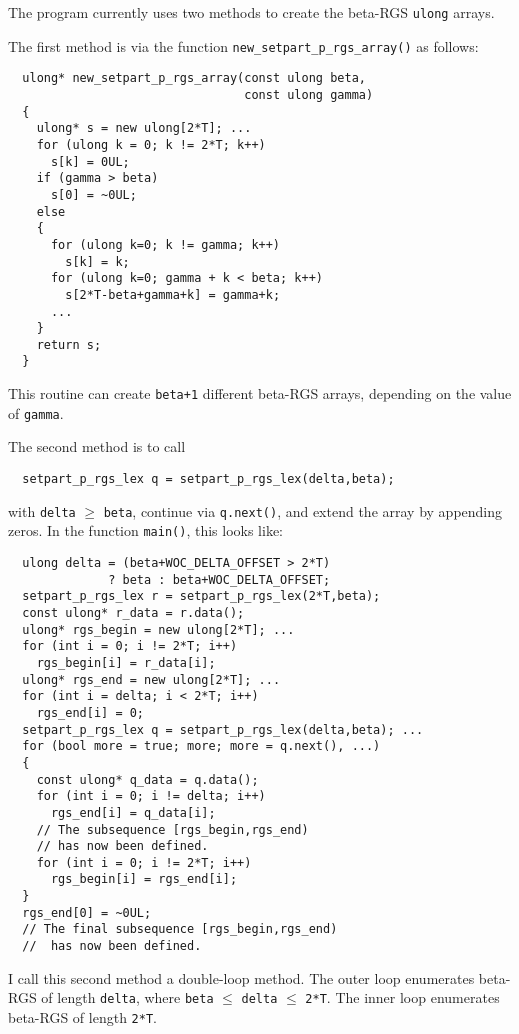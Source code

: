 \documentclass[12pt,a4paper]{article}
\begin{document}
The program currently uses two methods to create the beta-RGS \texttt{ulong} arrays.

The first method is via the function \verb!new_setpart_p_rgs_array()! as follows:

\begin{verbatim}
  ulong* new_setpart_p_rgs_array(const ulong beta, 
                                 const ulong gamma)
  {
    ulong* s = new ulong[2*T]; ...
    for (ulong k = 0; k != 2*T; k++) 
      s[k] = 0UL;
    if (gamma > beta)
      s[0] = ~0UL;
    else
    {
      for (ulong k=0; k != gamma; k++)
        s[k] = k;
      for (ulong k=0; gamma + k < beta; k++)
        s[2*T-beta+gamma+k] = gamma+k;
      ...
    }
    return s;
  }
\end{verbatim}

This routine can create \verb!beta+1! different beta-RGS arrays, depending on the
value of \verb!gamma!. 

The second method is to call 

\begin{verbatim}
  setpart_p_rgs_lex q = setpart_p_rgs_lex(delta,beta);
\end{verbatim}

with \verb!delta! $\geqslant$ \verb!beta!, continue via \verb!q.next()!, and extend the array by
appending zeros. In the function \verb!main()!, this looks like:

\begin{verbatim}
  ulong delta = (beta+WOC_DELTA_OFFSET > 2*T) 
              ? beta : beta+WOC_DELTA_OFFSET;
  setpart_p_rgs_lex r = setpart_p_rgs_lex(2*T,beta);
  const ulong* r_data = r.data();
  ulong* rgs_begin = new ulong[2*T]; ...
  for (int i = 0; i != 2*T; i++) 
    rgs_begin[i] = r_data[i];
  ulong* rgs_end = new ulong[2*T]; ...
  for (int i = delta; i < 2*T; i++)
    rgs_end[i] = 0;
  setpart_p_rgs_lex q = setpart_p_rgs_lex(delta,beta); ...
  for (bool more = true; more; more = q.next(), ...)
  {
    const ulong* q_data = q.data();
    for (int i = 0; i != delta; i++)
      rgs_end[i] = q_data[i];
    // The subsequence [rgs_begin,rgs_end) 
    // has now been defined.
    for (int i = 0; i != 2*T; i++)
      rgs_begin[i] = rgs_end[i];
  }
  rgs_end[0] = ~0UL;
  // The final subsequence [rgs_begin,rgs_end)
  //  has now been defined.
\end{verbatim}

I call this second method a double-loop method. The outer loop
enumerates beta-RGS of length \verb!delta!, 
where \verb!beta! $\leqslant$ \verb!delta! $\leqslant$ \verb!2*T!.
The inner loop enumerates beta-RGS of length \verb!2*T!.
\end{document}
